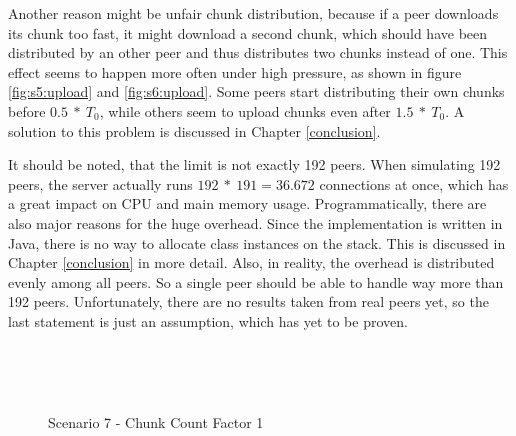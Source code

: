Another reason might be unfair chunk distribution, because if a peer downloads its chunk too fast, it might download a second chunk, which should have been distributed by an other peer and thus distributes two chunks instead of one. This effect seems to happen more often under high pressure, as shown in figure \ref{fig:s5:upload} and \ref{fig:s6:upload}. Some peers start distributing their own chunks before $0.5\:*\:T_0$, while others seem to upload chunks even after $1.5\:*\:T_0$. A solution to this problem is discussed in Chapter \ref{conclusion}.

It should be noted, that the limit is not exactly 192 peers. When simulating 192 peers, the server actually runs $192\:*\:191=36.672$ connections at once, which has a great impact on CPU and main memory usage. Programmatically, there are also major reasons for the huge overhead. Since the implementation is written in Java, there is no way to allocate class instances on the stack. This is discussed in Chapter \ref{conclusion} in more detail. Also, in reality, the overhead is distributed evenly among all peers. So a single peer should be able to handle way more than 192 peers. Unfortunately, there are no results taken from real peers yet, so the last statement is just an assumption, which has yet to be proven.

\vfill



\pagebreak
\begin{figure}[!ht]
	\begin{center}	
		~ %

	 	~ %

		\caption{Scenario 7 - Chunk Count Factor 1}
		\label{fig:s7}
	\end{center}
\end{figure}
\vfill

